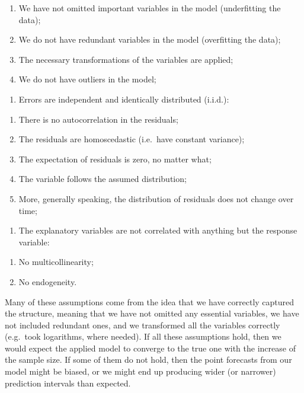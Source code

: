 \documentclass[
]{book}
\providecommand{\tightlist}{%
  \setlength{\itemsep}{0pt}\setlength{\parskip}{0pt}}
\theoremstyle{definition}
\theoremstyle{definition}
\theoremstyle{definition}
\theoremstyle{definition}
\theoremstyle{remark}
\begin{document}
\begin{enumerate}
\def\labelenumi{\alph{enumi}.}
\tightlist
\item
  We have not omitted important variables in the model (underfitting the data);
\item
  We do not have redundant variables in the model (overfitting the data);
\item
  The necessary transformations of the variables are applied;
\item
  We do not have outliers in the model;
\end{enumerate}

\begin{enumerate}
\def\labelenumi{\arabic{enumi}.}
\setcounter{enumi}{1}
\tightlist
\item
  Errors are independent and identically distributed (i.i.d.):
\end{enumerate}

\begin{enumerate}
\def\labelenumi{\alph{enumi}.}
\tightlist
\item
  There is no autocorrelation in the residuals;
\item
  The residuals are homoscedastic (i.e.~have constant variance);
\item
  The expectation of residuals is zero, no matter what;
\item
  The variable follows the assumed distribution;
\item
  More, generally speaking, the distribution of residuals does not change over time;
\end{enumerate}

\begin{enumerate}
\def\labelenumi{\arabic{enumi}.}
\setcounter{enumi}{2}
\tightlist
\item
  The explanatory variables are not correlated with anything but the response variable:
\end{enumerate}

\begin{enumerate}
\def\labelenumi{\alph{enumi}.}
\tightlist
\item
  No multicollinearity;
\item
  No endogeneity.
\end{enumerate}

Many of these assumptions come from the idea that we have correctly captured the structure, meaning that we have not omitted any essential variables, we have not included redundant ones, and we transformed all the variables correctly (e.g.~took logarithms, where needed). If all these assumptions hold, then we would expect the applied model to converge to the true one with the increase of the sample size. If some of them do not hold, then the point forecasts from our model might be biased, or we might end up producing wider (or narrower) prediction intervals than expected.
\end{document}
